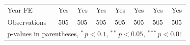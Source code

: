 \begin{table}[htbp]
\begin{tabular*}{\hsize}{@{\hskip\tabcolsep\extracolsep\fill}l*{7}{c}}
\midrule
\addlinespace Year FE&         Yes         &         Yes         &         Yes         &         Yes         &         Yes         &         Yes         &         Yes         \\
\addlinespace \midrule \addlinespace Observations&         505         &         505         &         505         &         505         &         505         &         505         &         505         \\
\bottomrule
\multicolumn{8}{l}{\footnotesize p-values in parentheses, $^{*}\, p<0.1$, $^{**}\, p<0.05$, $^{***}\, p<0.01$}\\
\end{tabular*}
\end{table}
